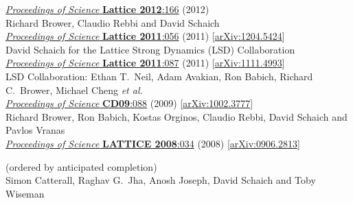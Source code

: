 \begin{spacelist}
\begin{revnumerate}
      \href{https://doi.org/10.22323/1.164.0166}{\textit{Proceedings of Science} \textbf{Lattice 2012}:166} (2012)
    \pagebreakitem
       \\
      Richard Brower, Claudio Rebbi and David Schaich \\
      \href{https://doi.org/10.22323/1.139.0056}{\textit{Proceedings of Science} \textbf{Lattice 2011}:056} (2011) [\href{http://arxiv.org/abs/1204.5424}{arXiv:1204.5424}]
    \pagebreakitem
       \\
      David Schaich for the Lattice Strong Dynamics (LSD) Collaboration \\
      \href{https://doi.org/10.22323/1.139.0087}{\textit{Proceedings of Science} \textbf{Lattice 2011}:087} (2011) [\href{http://arxiv.org/abs/1111.4993}{arXiv:1111.4993}]
    \pagebreakitem
       \\
      LSD Collaboration: Ethan T.~Neil, Adam Avakian, Ron Babich, Richard C.~Brower, Michael Cheng \textit{et al.} \\ %
      \href{https://doi.org/10.22323/1.086.0088}{\textit{Proceedings of Science} \textbf{CD09}:088} (2009) [\href{http://arxiv.org/abs/1002.3777}{arXiv:1002.3777}]
    \pagebreakitem
       \\
      Richard Brower, Ron Babich, Kostas Orginos, Claudio Rebbi, David Schaich and Pavlos Vranas \\
      \href{https://doi.org/10.22323/1.066.0034}{\textit{Proceedings of Science} \textbf{LATTICE 2008}:034} (2008) [\href{http://arxiv.org/abs/0906.2813}{arXiv:0906.2813}]
  \end{revnumerate}
%
%
%
 \hfill(ordered by anticipated completion)
  \pagebreakitem
     \\
    Simon Catterall, Raghav G.~Jha, Anosh Joseph, David Schaich and Toby Wiseman \\

\end{spacelist}
